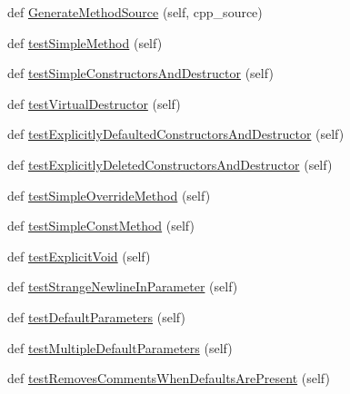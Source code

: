 \begin{DoxyCompactItemize}
\item 
def \hyperlink{classcpp_1_1gmock__class__test_1_1_generate_methods_test_af96a6c9fd394f7e27cf24f86814549c9}{Generate\+Method\+Source} (self, cpp\+\_\+source)
\item 
def \hyperlink{classcpp_1_1gmock__class__test_1_1_generate_methods_test_a3ece43a88823e3fe1b4731819505bd61}{test\+Simple\+Method} (self)
\item 
def \hyperlink{classcpp_1_1gmock__class__test_1_1_generate_methods_test_abb0adf9fa7afd25d63964a9075af1414}{test\+Simple\+Constructors\+And\+Destructor} (self)
\item 
def \hyperlink{classcpp_1_1gmock__class__test_1_1_generate_methods_test_a3095f7046a089b3c8a13e7e8161a2ab2}{test\+Virtual\+Destructor} (self)
\item 
def \hyperlink{classcpp_1_1gmock__class__test_1_1_generate_methods_test_a0a2a15e9eb43aff0fec7e89a81c30987}{test\+Explicitly\+Defaulted\+Constructors\+And\+Destructor} (self)
\item 
def \hyperlink{classcpp_1_1gmock__class__test_1_1_generate_methods_test_a4e6c2d2de1e21e63672ebbb75676c45c}{test\+Explicitly\+Deleted\+Constructors\+And\+Destructor} (self)
\item 
def \hyperlink{classcpp_1_1gmock__class__test_1_1_generate_methods_test_a2b1501cf9517acbeb48d11e9d8992a9b}{test\+Simple\+Override\+Method} (self)
\item 
def \hyperlink{classcpp_1_1gmock__class__test_1_1_generate_methods_test_ad8cb9c2f99fa65c7d3fee054dde0e30d}{test\+Simple\+Const\+Method} (self)
\item 
def \hyperlink{classcpp_1_1gmock__class__test_1_1_generate_methods_test_a4db373bb8953d0523425b5a3f392e761}{test\+Explicit\+Void} (self)
\item 
def \hyperlink{classcpp_1_1gmock__class__test_1_1_generate_methods_test_a184995b077a46f3408fa203cb0626614}{test\+Strange\+Newline\+In\+Parameter} (self)
\item 
def \hyperlink{classcpp_1_1gmock__class__test_1_1_generate_methods_test_a61abb614ad02a1fef3ece3813695c22a}{test\+Default\+Parameters} (self)
\item 
def \hyperlink{classcpp_1_1gmock__class__test_1_1_generate_methods_test_a41b91cc39a55385b8c4b97d804e80345}{test\+Multiple\+Default\+Parameters} (self)
\item 
def \hyperlink{classcpp_1_1gmock__class__test_1_1_generate_methods_test_add445941c6503198f0c3a25e00d20b9f}{test\+Removes\+Comments\+When\+Defaults\+Are\+Present} (self)

\end{DoxyCompactItemize}
